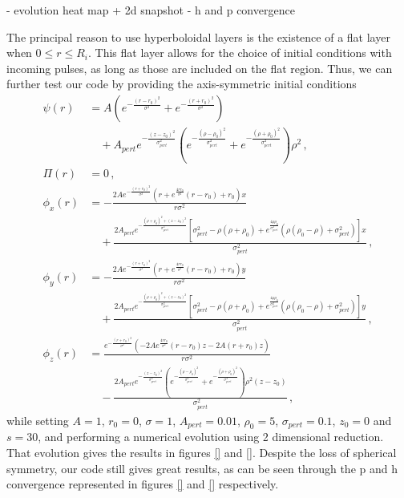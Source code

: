 - evolution heat map + 2d snapshot
- h and p convergence


The principal reason to use hyperboloidal layers is the existence of a flat layer when $0 \leq r \leq R_i$. This flat layer allows for the choice of initial conditions with incoming pulses, as long as those are included on the flat region. Thus, we can further test our code by providing the axis-symmetric initial conditions
%
\begin{align}
    \psi(r) &= A \left( e^{-\frac{(r - r_0)^2}{\sigma^2}} + e^{-\frac{(r + r_0)^2}{\sigma^2}} \right) \nonumber \\ 
    &\quad + A_{pert} e^{-\frac{(z - z_{0})^2}{\sigma_{pert}^2}} \left( e^{-\frac{(\rho - \rho_{0})^2}{\sigma_{pert}^2}} + e^{-\frac{(\rho + \rho_{0})^2}{\sigma_{pert}^2}} \right) \rho^2 \, , \\
    \Pi(r) &= 0 \, , \\
    \phi_x(r) &= -\frac{2 A e^{-\frac{(r + r_0)^2}{\sigma^2}} \left( r + e^{\frac{4 r r_0}{\sigma^2}}(r - r_0) + r_0 \right) x}{r \sigma^2} \nonumber \\
    &\quad + \frac{2 A_{pert} e^{-\frac{( \rho + \rho_{0} )^2 + ( z - z_{0} )^2}{\sigma_{pert}^2}} \left[ \sigma_{pert}^2 - \rho(\rho + \rho_{0}) + e^{\frac{4 \rho \rho_{0}}{\sigma_{pert}^2}} ( \rho( \rho_{0} - \rho ) + \sigma_{pert}^2 ) \right] x}{\sigma_{pert}^2} \, , \\
    \phi_y(r) &= -\frac{2 A e^{-\frac{(r + r_0)^2}{\sigma^2}} \left( r + e^{\frac{4 r r_0}{\sigma^2}}(r - r_0) + r_0 \right) y}{r \sigma^2} \nonumber \\
    &\quad + \frac{2 A_{pert} e^{-\frac{( \rho + \rho_{0} )^2 + ( z - z_{0} )^2}{\sigma_{pert}^2}} \left[ \sigma_{pert}^2 - \rho(\rho + \rho_{0}) + e^{\frac{4 \rho \rho_{0}}{\sigma_{pert}^2}} ( \rho( \rho_{0} - \rho ) + \sigma_{pert}^2 ) \right] y}{\sigma_{pert}^2} \, , \\
    \phi_z(r) &= \frac{e^{-\frac{(r + r_0)^2}{\sigma^2}} \left( -2 A e^{\frac{4 r r_0}{\sigma^2}}(r - r_0) z - 2 A (r + r_0) z \right)}{r \sigma^2} \nonumber \\
    &\quad - \frac{2 A_{pert} e^{-\frac{(z - z_{0})^2}{\sigma_{pert}^2}} \left( e^{-\frac{(\rho - \rho_{0})^2}{\sigma_{pert}^2}} + e^{-\frac{(\rho + \rho_{0})^2}{\sigma_{pert}^2}} \right) \rho^2 (z - z_{0})}{\sigma_{pert}^2} \, ,
\end{align}
%
while setting $A = 1$, $r_0 = 0$, $\sigma = 1$, $A_{pert} = 0.01$, $\rho_0 = 5$, $\sigma_{pert} = 0.1$, $z_0 = 0$ and $s = 30$, and performing a numerical evolution using 2 dimensional reduction. That evolution gives the results in figures \ref{} and \ref{}. Despite the loss of spherical symmetry, our code still gives great results, as can be seen through the p and h convergence represented in figures \ref{} and \ref{} respectively.

